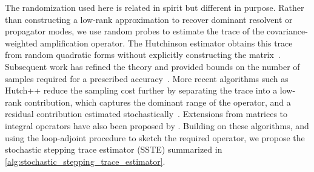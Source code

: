 The randomization used here is related in spirit but different in purpose. Rather than constructing a low-rank approximation to recover dominant resolvent or propagator modes, we use random probes to estimate the trace of the covariance-weighted amplification operator. The Hutchinson estimator obtains this trace from random quadratic forms without explicitly constructing the matrix~\citep{hutchinson-1990}. Subsequent work has refined the theory and provided bounds on the number of samples required for a prescribed accuracy~\citep{khorasani-szekely-ascher-2015}. More recent algorithms such as Hutch++ reduce the sampling cost further by separating the trace into a low-rank contribution, which captures the dominant range of the operator, and a residual contribution estimated stochastically~\citep{meyer-et-al-2021}. Extensions from matrices to integral operators have also been proposed by \citet{zvonek-horning-townsend-2025}. Building on these algorithms, and using the loop-adjoint procedure to sketch the required operator, we propose the stochastic stepping trace estimator (SSTE) summarized in \cref{alg:stochastic_stepping_trace_estimator}.
